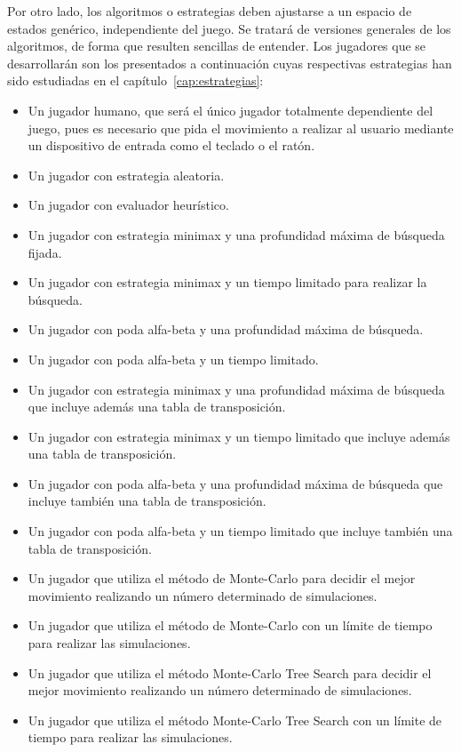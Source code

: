 Por otro lado, los algoritmos o estrategias deben ajustarse a un espacio de estados genérico, independiente del juego.
Se tratará de versiones generales de los algoritmos, de forma que resulten sencillas de entender.
Los jugadores que se desarrollarán son los presentados a continuación cuyas respectivas estrategias han sido estudiadas en el capítulo~\ref{cap:estrategias}:
\begin{itemize}
\renewcommand{\labelitemi}{$\bullet$}
	\item Un jugador humano, que será el único jugador totalmente dependiente del juego, pues es necesario que pida el movimiento a realizar al usuario mediante un dispositivo de entrada como el teclado o el ratón.
	\item Un jugador con estrategia aleatoria.
	\item Un jugador con evaluador heurístico.
	\item Un jugador con estrategia minimax y una profundidad máxima de búsqueda fijada.
	\item Un jugador con estrategia minimax y un tiempo limitado para realizar la búsqueda.
	\item Un jugador con poda alfa-beta y una profundidad máxima de búsqueda.
	\item Un jugador con poda alfa-beta y un tiempo limitado.
	\item Un jugador con estrategia minimax y una profundidad máxima de búsqueda que incluye además una tabla de transposición.
	\item Un jugador con estrategia minimax y un tiempo limitado que incluye además una tabla de transposición.
	\item Un jugador con poda alfa-beta y una profundidad máxima de búsqueda que incluye también una tabla de transposición.
	\item Un jugador con poda alfa-beta y un tiempo limitado que incluye también una tabla de transposición.
	\item Un jugador que utiliza el método de Monte-Carlo para decidir el mejor movimiento realizando un número determinado de simulaciones.
	\item Un jugador que utiliza el método de Monte-Carlo con un límite de tiempo para realizar las simulaciones.
	\item Un jugador que utiliza el método Monte-Carlo Tree Search para decidir el mejor movimiento realizando un número determinado de simulaciones.
	\item Un jugador que utiliza el método Monte-Carlo Tree Search con un límite de tiempo para realizar las simulaciones.
\end{itemize}

